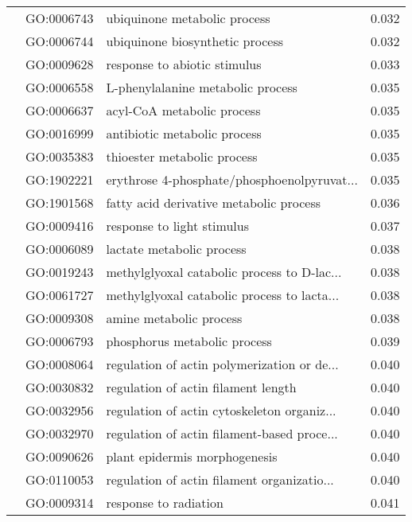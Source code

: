 \begin{longtable}{lllr}
   & GO:0006743 &                 ubiquinone metabolic process &         0.032 \\
   & GO:0006744 &              ubiquinone biosynthetic process &         0.032 \\
   & GO:0009628 &                 response to abiotic stimulus &         0.033 \\
   & GO:0006558 &            L-phenylalanine metabolic process &         0.035 \\
   & GO:0006637 &                   acyl-CoA metabolic process &         0.035 \\
   & GO:0016999 &                 antibiotic metabolic process &         0.035 \\
   & GO:0035383 &                  thioester metabolic process &         0.035 \\
   & GO:1902221 &  erythrose 4-phosphate/phosphoenolpyruvat... &         0.035 \\
   & GO:1901568 &      fatty acid derivative metabolic process &         0.036 \\
   & GO:0009416 &                   response to light stimulus &         0.037 \\
   & GO:0006089 &                    lactate metabolic process &         0.038 \\
   & GO:0019243 &  methylglyoxal catabolic process to D-lac... &         0.038 \\
   & GO:0061727 &  methylglyoxal catabolic process to lacta... &         0.038 \\
   & GO:0009308 &                      amine metabolic process &         0.038 \\
   & GO:0006793 &                 phosphorus metabolic process &         0.039 \\
   & GO:0008064 &  regulation of actin polymerization or de... &         0.040 \\
   & GO:0030832 &          regulation of actin filament length &         0.040 \\
   & GO:0032956 &  regulation of actin cytoskeleton organiz... &         0.040 \\
   & GO:0032970 &  regulation of actin filament-based proce... &         0.040 \\
   & GO:0090626 &                plant epidermis morphogenesis &         0.040 \\
   & GO:0110053 &  regulation of actin filament organizatio... &         0.040 \\
   & GO:0009314 &                        response to radiation &         0.041 \\

\end{longtable}
